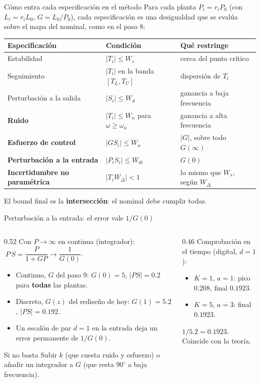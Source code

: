 \documentclass[aspectratio=169,11pt]{beamer}
\begin{document}
\begin{frame}{Cómo entra cada especificación en el método}
  \footnotesize
  Para cada planta $P_i=r_iP_0$ (con $L_i=r_iL_0$, $G=L_0/P_0$), cada especificación es una desigualdad que se evalúa sobre el mapa del nominal, como en el paso 8:
  \begin{center}
  \begin{tabular}{l|l|l}
    Especificación & Condición & Qué restringe\\\hline
    Estabilidad & $|T_i|\le W_s$ & cerca del punto crítico\\
    Seguimiento & $|T_i|$ en la banda $[T_L,T_U]$ & dispersión de $T_i$\\
    Perturbación a la salida & $|S_i|\le W_d$ & ganancia a baja frecuencia\\
    \textbf{Ruido} & $|T_i|\le W_n$ para $\omega\ge\omega_n$ & ganancia a alta frecuencia\\
    \textbf{Esfuerzo de control} & $|G S_i|\le W_u$ & $|G|$, sobre todo $G(\infty)$\\
    \textbf{Perturbación a la entrada} & $|P_iS_i|\le W_{di}$ & $G(0)$\\
    \textbf{Incertidumbre no paramétrica} & $|T_iW_\Delta|<1$ & lo mismo que $W_s$, según $W_\Delta$
  \end{tabular}
  \end{center}
  El bound final es la \textbf{intersección}: el nominal debe cumplir todas.
\end{frame}

\begin{frame}{Perturbación a la entrada: el error vale $1/G(0)$}
  \footnotesize
  \begin{columns}[T]
  \begin{column}{0.52\textwidth}
    Con $P\to\infty$ en continua (integrador): $\ P\,S=\dfrac{P}{1+GP}\to\dfrac{1}{G(0)}$.
    \begin{itemize}
      \item Continuo, $G$ del paso 9: $G(0)=5$, $|PS|=0.2$ para \textbf{todas} las plantas.
      \item Discreto, $G(z)$ del rediseño de hoy: $G(1)=5.2$, $|PS|=0.192$.
      \item Un escalón de par $d=1$ en la entrada deja un error permanente de $1/G(0)$.
    \end{itemize}
    \begin{alertblock}{Si no basta}
      Subir $k$ (que cuesta ruido y esfuerzo) o añadir un integrador a $G$ (que resta $90^\circ$ a baja frecuencia).
    \end{alertblock}
  \end{column}
  \begin{column}{0.46\textwidth}
    Comprobación en el tiempo (digital, $d=1$):
    \begin{itemize}
      \item $K=1$, $a=1$: pico $0.208$, final $0.1923$.
      \item $K=5$, $a=3$: final $0.1923$.
    \end{itemize}
    $1/5.2=0.1923$. Coincide con la teoría.
  \end{column}
  \end{columns}
\end{frame}
\end{document}
